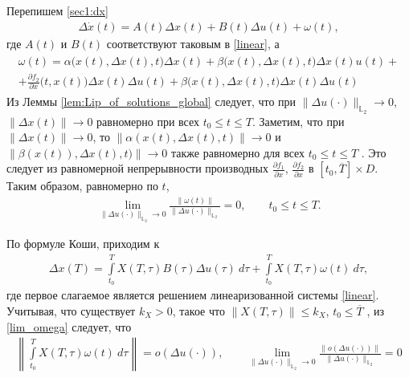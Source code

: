 \documentclass[../main.tex]{subfiles}
\begin{document}
	Перепишем \eqref{sec1:dx}
	\begin{gather}\label{sec1:dx1}
		\Delta \dot{x}(t) =
		A(t) \Delta x(t)  + 
		B(t) \Delta u(t)  + 
		\omega(t),
	\end{gather}
	где $A(t)$ и $B(t)$ соответствуют таковым в \eqref{linear}, а
	\begin{gather*}
		\begin{gathered}
			\omega(t) = 
			 \alpha\big(x(t),\Delta x(t), t\big) \Delta x(t)  + 
			 \beta\big(x(t),\Delta x(t), t\big)  \Delta x(t) u(t)  + \\ +
			  \frac{\partial f_2}{\partial x} \Big(t, x(t)\Big) \Delta x(t) \Delta u(t) + 
			  \beta\Big(x(t),\Delta x(t), t\Big) \Delta x(t) \Delta u(t) 
		\end{gathered}	
	\end{gather*}
	Из Леммы \ref{lem:Lip_of_solutions_global} следует, что при $\|\Delta u(\cdot)\|_{\mathbb{L}_2} \to 0$, $\|\Delta x(t)\| \to 0$ равномерно при всех $t_0 \leqslant t \leqslant T$.  Заметим, что при $\|\Delta x(t)\| \to 0$, то $	 \left\|  \alpha(x(t),\Delta x(t), t) \right\|  \to 0 $ и $ \left\|  \beta(x(t)),\Delta x(t), t) \right\|  \to 0 $ также равномерно для всех  $ t_0 \leqslant t \leqslant T $ . Это следует из равномерной непрерывности производных $\frac{\partial f_1}{\partial x}$, $\frac{\partial f_2}{\partial x}$ в $[t_0, \overline{T}] \times D$.  Таким образом, равномерно по $t$,
	\begin{gather}\label{lim_omega}
		\lim\limits_{\|\Delta u(\cdot) \|_{\mathbb{L}_2} \to 0}  \frac{ \| \omega(t) \| }{\|\Delta u(\cdot) \|_{\mathbb{L}_2}}  = 0, \qquad  t_0 \leqslant t \leqslant T .
	\end{gather}
	
	По формуле Коши, приходим к 
	\begin{gather*}
		\Delta x(T) = \int\limits_{t_0}^{T} X(T, \tau) B(\tau) \Delta u(\tau) \ d\tau + \int\limits_{t_0}^{T}  X(T, \tau) \omega(t) \ d\tau,
	\end{gather*}
	где первое слагаемое является решением линеаризованной системы \eqref{linear}.
	Учитывая, что существует $k_X > 0$, такое что $\|X(T, \tau) \| \leqslant k_X$, $t_0 \leqslant \overline{T} $ \cite[док-во Теоремы 3]{Fillipov},  из \eqref{lim_omega} следует, что 
	\begin{gather*}
		\left\|\int\limits_{t_0}^{T}  X(T, \tau) \omega(t) \ d\tau  \right\| = o(\Delta u(\cdot)), \qquad \lim\limits_{\|\Delta u(\cdot) \|_{\mathbb{L}_2} \to 0}  \frac{ \| o(\Delta u(\cdot)) \| }{\|\Delta u(\cdot) \|_{\mathbb{L}_2}}  = 0
	\end{gather*}
	
\end{document}

